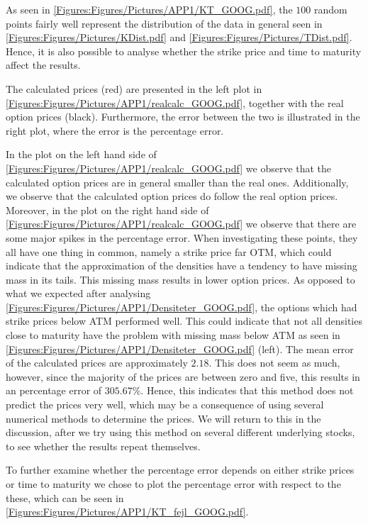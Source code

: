 As seen in \autoref{Figures:Figures/Pictures/APP1/KT_GOOG.pdf}, the $100$ random points fairly well represent the distribution of the data in general seen in \autoref{Figures:Figures/Pictures/KDist.pdf} and \autoref{Figures:Figures/Pictures/TDist.pdf}. Hence, it is also possible to analyse whether the strike price and time to maturity affect the results. 

The calculated prices (red) are presented in the left plot in \autoref{Figures:Figures/Pictures/APP1/realcalc_GOOG.pdf}, together with the real option prices (black). Furthermore, the error between the two is illustrated in the right plot, where the error is the percentage error. 


In the plot on the left hand side of \autoref{Figures:Figures/Pictures/APP1/realcalc_GOOG.pdf} we observe that the calculated option prices are in general smaller than the real ones. Additionally, we observe that the calculated option prices do follow the real option prices. Moreover, in the plot on the right hand side of \autoref{Figures:Figures/Pictures/APP1/realcalc_GOOG.pdf} we observe that there are some major spikes in the percentage error. When investigating these points, they all have one thing in common, namely a strike price far OTM, which could indicate that the approximation of the densities have a tendency to have missing mass in its tails. This missing mass results in lower option prices. As opposed to what we expected after analysing \autoref{Figures:Figures/Pictures/APP1/Densiteter_GOOG.pdf}, the options which had strike prices below ATM performed well. This could indicate that not all densities close to maturity have the problem with missing mass below ATM as seen in \autoref{Figures:Figures/Pictures/APP1/Densiteter_GOOG.pdf} (left). The mean error of the calculated prices are approximately $2.18$. This does not seem as much, however, since the majority of the prices are between zero and five, this results in an percentage error of $305.67\%$. Hence, this indicates that this method does not predict the prices very well, which may be a consequence of using several numerical methods to determine the prices. We will return to this in the discussion, after we try using this method on several different underlying stocks, to see whether the results repeat themselves. 

To further examine whether the percentage error depends on either strike prices or time to maturity we chose to plot the percentage error with respect to the these, which can be seen in \autoref{Figures:Figures/Pictures/APP1/KT_fejl_GOOG.pdf}. 

